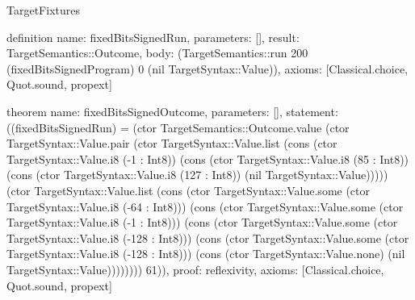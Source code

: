 \begin{lexlean}{TargetFixtures}
\begin{semanticmodule}
definition{
  name: fixedBitsSignedRun,
  parameters: [],
  result: TargetSemantics::Outcome,
  body: (TargetSemantics::run 200 (fixedBitsSignedProgram) 0 (nil TargetSyntax::Value)),
  axioms: [Classical.choice, Quot.sound, propext]
}

theorem{
  name: fixedBitsSignedOutcome,
  parameters: [],
  statement: ((fixedBitsSignedRun) = (ctor TargetSemantics::Outcome.value (ctor TargetSyntax::Value.pair (ctor TargetSyntax::Value.list (cons (ctor TargetSyntax::Value.i8 (-1 : Int8)) (cons (ctor TargetSyntax::Value.i8 (85 : Int8)) (cons (ctor TargetSyntax::Value.i8 (127 : Int8)) (nil TargetSyntax::Value))))) (ctor TargetSyntax::Value.list (cons (ctor TargetSyntax::Value.some (ctor TargetSyntax::Value.i8 (-64 : Int8))) (cons (ctor TargetSyntax::Value.some (ctor TargetSyntax::Value.i8 (-1 : Int8))) (cons (ctor TargetSyntax::Value.some (ctor TargetSyntax::Value.i8 (-128 : Int8))) (cons (ctor TargetSyntax::Value.some (ctor TargetSyntax::Value.i8 (-128 : Int8))) (cons (ctor TargetSyntax::Value.none) (nil TargetSyntax::Value)))))))) 61)),
  proof: reflexivity{},
  axioms: [Classical.choice, Quot.sound, propext]
}


\end{semanticmodule}
\end{lexlean}
